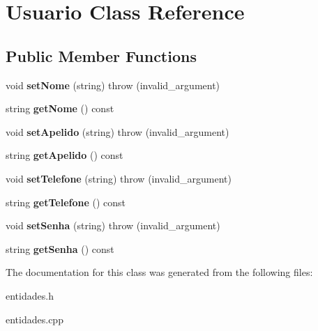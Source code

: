 \hypertarget{classUsuario}{}\section{Usuario Class Reference}
\label{classUsuario}
\subsection*{Public Member Functions}
\begin{DoxyCompactItemize}
\item 
\mbox{\label{classUsuario_a0d002d4ceff9c827457269a24a3e6c24}} 
void {\bfseries set\+Nome} (string)  throw (invalid\+\_\+argument)
\item 
\mbox{\label{classUsuario_a6aeb8cccd96e84aedeb50a68b4f9a3d4}} 
string {\bfseries get\+Nome} () const
\item 
\mbox{\label{classUsuario_a1da1c9170ba41c06b9adea159d21c092}} 
void {\bfseries set\+Apelido} (string)  throw (invalid\+\_\+argument)
\item 
\mbox{\label{classUsuario_a78d374a50eed8b7ceeec4b874ba154d4}} 
string {\bfseries get\+Apelido} () const
\item 
\mbox{\label{classUsuario_adae349ec93a5a83bb4e2b379a181431b}} 
void {\bfseries set\+Telefone} (string)  throw (invalid\+\_\+argument)
\item 
\mbox{\label{classUsuario_ae2a44b0716930c62458e6fc8c7339537}} 
string {\bfseries get\+Telefone} () const
\item 
\mbox{\label{classUsuario_a428675e3b6d3743e05b1297cca1dee42}} 
void {\bfseries set\+Senha} (string)  throw (invalid\+\_\+argument)
\item 
\mbox{\label{classUsuario_a5a6149716b03d4b1408aaa6a0dc4bb32}} 
string {\bfseries get\+Senha} () const
\end{DoxyCompactItemize}


The documentation for this class was generated from the following files\+:\begin{DoxyCompactItemize}
\item 
entidades.\+h\item 
entidades.\+cpp\end{DoxyCompactItemize}
